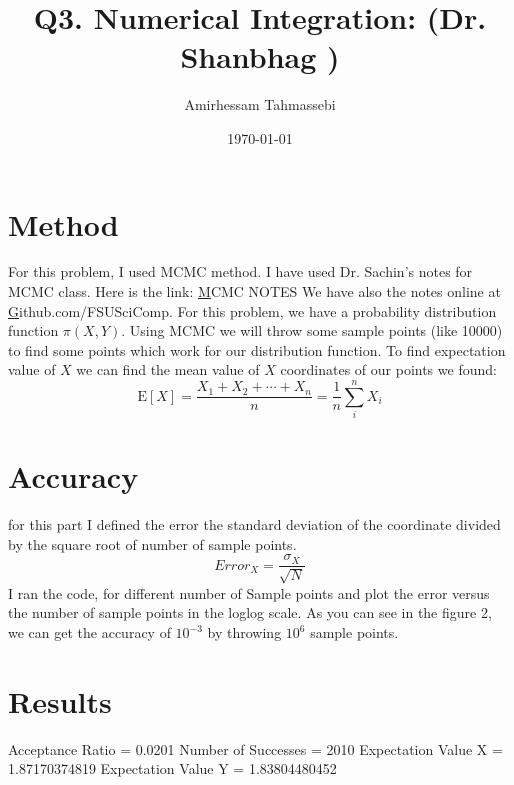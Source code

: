 \documentclass[a4paper]{article}
\title{Q3. Numerical Integration: (Dr. Shanbhag )}
\author{Amirhessam Tahmassebi}
\date{\today}
\begin{document}
\maketitle



\section{Method}

For this problem, I used MCMC method. I have used Dr. Sachin's notes for MCMC class. Here is the link:
\href{https://sites.google.com/site/drsachinshanbhag/teaching/isc-5228}MCMC NOTES \newline
We have also the notes online at
\href{https://github.com/FSUSciComp/lecture-notes/tree/master/MCMC}Github.com/FSUSciComp. \newline
For this problem, we have a probability distribution function $\pi (X,Y)$. Using MCMC we will throw some sample points (like 10000) to find some points which work for our distribution function.
To find expectation value of $X$ we can find the mean value of $X$ coordinates of our points we found:\newline
$$\text{E}[X]  = \frac{X_1 + X_2 + \cdots + X_n}{n}
      = \frac{1}{n}\sum_{i}^{n} X_i$$


\section{Accuracy}
for this part I defined the error the standard deviation of the coordinate divided by the square root of number of sample points.
$$ Error_{X} = \frac{\sigma_{X}}{\sqrt{N}}$$
I ran the code, for different number of Sample points and plot the error versus the number of sample points in the loglog scale. As you can see in the figure 2, we can get the accuracy of $10^{-3}$ by throwing $10^6$ sample points.

\section{Results}

Acceptance Ratio = 0.0201 \newline
Number of Successes = 2010 \newline
Expectation Value X = 1.87170374819 \newline
Expectation Value Y = 1.83804480452 \newline
\end{document}
